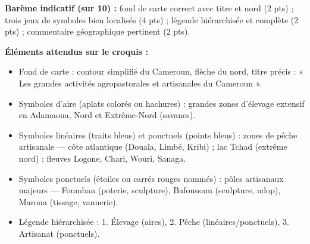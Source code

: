 \documentclass[11pt]{article}
\begin{document}
\begin{corrige}
\textbf{Barème indicatif (sur 10) :} fond de carte correct avec titre et nord (2 pts) ; trois jeux de symboles bien localisés (4 pts) ; légende hiérarchisée et complète (2 pts) ; commentaire géographique pertinent (2 pts).

\textbf{Éléments attendus sur le croquis :}
\begin{itemize}
\item Fond de carte : contour simplifié du Cameroun, flèche du nord, titre précis : « Les grandes activités agropastorales et artisanales du Cameroun ».
\item Symboles d'aire (aplats colorés ou hachures) : grandes zones d'élevage extensif en Adamaoua, Nord et Extrême-Nord (savanes).
\item Symboles linéaires (traits bleus) et ponctuels (points bleus) : zones de pêche artisanale — côte atlantique (Douala, Limbé, Kribi) ; lac Tchad (extrême nord) ; fleuves Logone, Chari, Wouri, Sanaga.
\item Symboles ponctuels (étoiles ou carrés rouges nommés) : pôles artisanaux majeurs — Foumban (poterie, sculpture), Bafoussam (sculpture, ndop), Maroua (tissage, vannerie).
\item Légende hiérarchisée : 1. Élevage (aires), 2. Pêche (linéaires/ponctuels), 3. Artisanat (ponctuels).
\end{itemize}


\end{corrige}
\end{document}

